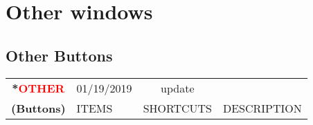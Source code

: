 \section{Other windows }%
\label{sec:other_windows}

\subsection{Other Buttons }%
\label{ssec:other_buttons}

\begin{center}
    \small 
    \begin{longtable}{ >{\bfseries}c l c p{6cm}}             
        \toprule
        \multirow{2}*{\textcolor{red}{OTHER}} & 01/19/2019 & update & \\
        \noalign{\smallskip}
        \cline{2-4}
        \noalign{\smallskip}
        (Buttons) & ITEMS & SHORTCUTS & DESCRIPTION\\
        \midrule        
        \endhead   
        

\end{longtable}
\end{center}
